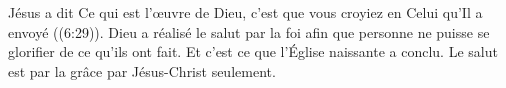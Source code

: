 Jésus a dit\frcolon{} 
 \Og Ce qui est l'\oe{}uvre de Dieu, c'est que vous croyiez en Celui
 qu'Il a envoyé \Fg{} ((6:29)).
 Dieu a réalisé le salut par la foi afin que personne ne puisse
 se glorifier de ce qu'ils ont fait. Et c'est ce que l'Église 
 naissante a conclu. Le salut est par la grâce \ocadr par Jésus-Christ seulement.

\dvrule


